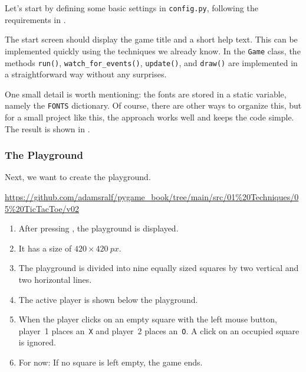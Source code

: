 Let's start by defining some basic settings in \texttt{config.py}, following the requirements in .


The start screen should display the game title and a short help text. This can be implemented quickly using the techniques we already know. In the \texttt{Game} class, the methods \texttt{run()}, \texttt{watch\_for\_events()}, \texttt{update()}, and \texttt{draw()} are implemented in a straightforward way without any surprises.

One small detail is worth mentioning: the fonts are stored in a static variable, namely the \texttt{FONTS} dictionary. Of course, there are other ways to organize this, but for a small project like this, the approach works well and keeps the code simple. The result is shown in .




\subsubsection{The Playground}

Next, we want to create the playground.
\begin{diskbox}
	\url{https://github.com/adamsralf/pygame_book/tree/main/src/01%20Techniques/05%20TicTacToe/v02}
\end{diskbox}

\begin{enumerate}
	\item After pressing , the playground is displayed.\label{reqTicTacToePlaygroundStart}
	
	\item It has a size of $420\times \SI{420}{px}$.\label{reqTicTacToePlaygroundSize}
	
	\item The playground is divided into nine equally sized squares by two vertical and two horizontal lines.\label{reqTicTacToePlaygroundGrid}
	
	\item The active player is shown below the playground.\label{reqTicTacToePlaygroundActivPlayer}
	
	\item When the player clicks on an empty square with the left mouse button, player~1 places an~\texttt{X} and player~2 places an~\texttt{O}. A click on an occupied square is ignored.\label{reqTicTacToePlaygroundMove}
	
	\item For now: If no square is left empty, the game ends.\label{reqTicTacToePlaygroundFull}
\end{enumerate}
\er

